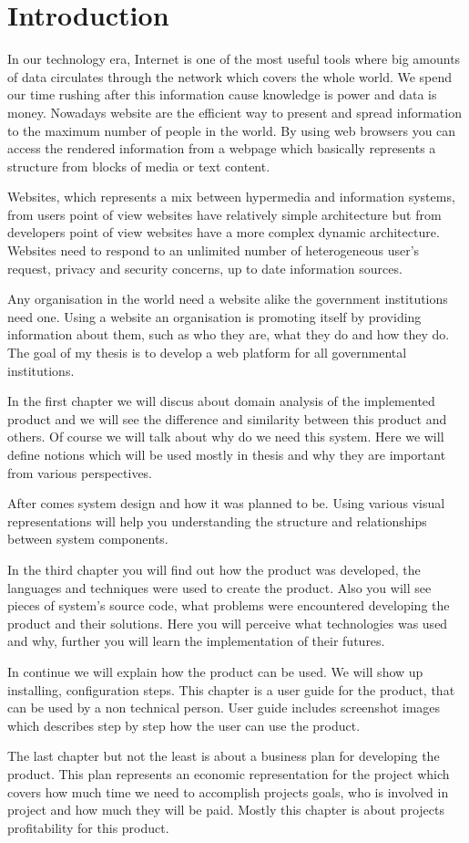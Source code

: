 \section*{Introduction}
In our technology era, Internet is one of the most useful tools where big amounts of data circulates through the network which covers the whole world. We spend our time rushing after this information cause knowledge is power and data is money. Nowadays website are the efficient way to present and spread information to the maximum number of people in the world. By using web browsers you can access the rendered information from a webpage which basically represents a structure from blocks of media or text content.

Websites, which represents a mix between hypermedia and information systems, from users point of view websites have relatively simple architecture but from developers point of view websites have a more complex dynamic architecture. Websites need to respond to an unlimited number of heterogeneous user’s request, privacy and security concerns, up to date information sources.

Any organisation in the world need a website alike the government institutions need one. Using a website an organisation is promoting itself by providing information about them, such as who they are, what they do and how they do. The goal of my thesis is to develop a web platform for all governmental institutions.

In the first chapter we will discus about domain analysis of the implemented product and we will see the difference and similarity between this product and others. Of course we will talk about why do we need this system. Here we will define notions which will be used mostly in thesis and why they are important from various perspectives. 

After comes system design and how it was planned to be. Using various visual representations will help you understanding the structure and relationships between system components.

In the third chapter you will find out how the product was developed, the languages and techniques were used to create the product. Also you will see pieces of system’s source code, what problems were encountered developing the product and their solutions. Here you will perceive what technologies was used and why, further you will learn the implementation of their futures.

In continue we will explain how the product can be used. We will show up installing, configuration steps. This chapter is a user guide for the product, that can be used by a non technical person. User guide includes screenshot images which describes step by step how the user can use the product.

The last chapter but not the least is about a business plan for developing the product. This plan represents an economic representation for the project which covers how much time we need to accomplish projects goals, who is involved in project and how much they will be paid. Mostly this chapter is about projects profitability for this product.